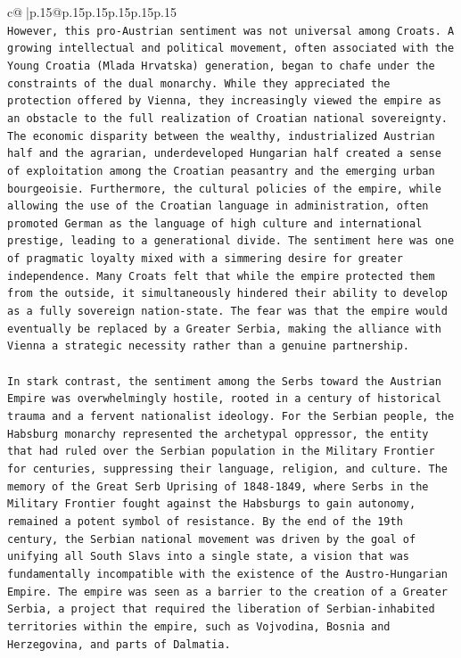 \documentclass{article}
\begin{document}
{\begin{supertabular}{c@{$\;$}|p{.15\linewidth}@{}p{.15\linewidth}p{.15\linewidth}p{.15\linewidth}p{.15\linewidth}p{.15\linewidth}}
{{{\\ 
\texttt{However, this pro{-}Austrian sentiment was not universal among Croats. A growing intellectual and political movement, often associated with the Young Croatia (Mlada Hrvatska) generation, began to chafe under the constraints of the dual monarchy. While they appreciated the protection offered by Vienna, they increasingly viewed the empire as an obstacle to the full realization of Croatian national sovereignty. The economic disparity between the wealthy, industrialized Austrian half and the agrarian, underdeveloped Hungarian half created a sense of exploitation among the Croatian peasantry and the emerging urban bourgeoisie. Furthermore, the cultural policies of the empire, while allowing the use of the Croatian language in administration, often promoted German as the language of high culture and international prestige, leading to a generational divide. The sentiment here was one of pragmatic loyalty mixed with a simmering desire for greater independence. Many Croats felt that while the empire protected them from the outside, it simultaneously hindered their ability to develop as a fully sovereign nation{-}state. The fear was that the empire would eventually be replaced by a Greater Serbia, making the alliance with Vienna a strategic necessity rather than a genuine partnership.} \\
\\ 
\texttt{In stark contrast, the sentiment among the Serbs toward the Austrian Empire was overwhelmingly hostile, rooted in a century of historical trauma and a fervent nationalist ideology. For the Serbian people, the Habsburg monarchy represented the archetypal oppressor, the entity that had ruled over the Serbian population in the Military Frontier for centuries, suppressing their language, religion, and culture. The memory of the Great Serb Uprising of 1848{-}1849, where Serbs in the Military Frontier fought against the Habsburgs to gain autonomy, remained a potent symbol of resistance. By the end of the 19th century, the Serbian national movement was driven by the goal of unifying all South Slavs into a single state, a vision that was fundamentally incompatible with the existence of the Austro{-}Hungarian Empire. The empire was seen as a barrier to the creation of a Greater Serbia, a project that required the liberation of Serbian{-}inhabited territories within the empire, such as Vojvodina, Bosnia and Herzegovina, and parts of Dalmatia.} \\
\\ 
}}}
\end{supertabular}}
\end{document}
